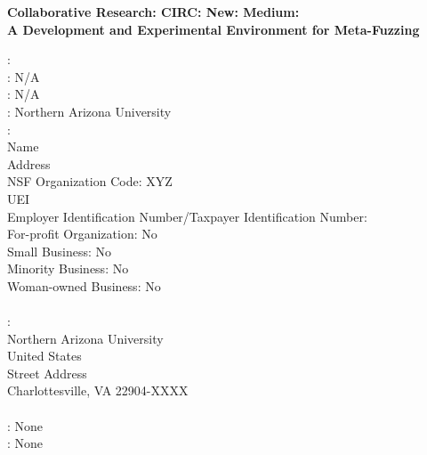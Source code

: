 

\begin{Center}
\Large
\bf
Collaborative Research: CIRC: New: Medium: \\A Development and Experimental Environment for Meta-Fuzzing
\end{Center}

\noindent {}: 
\\

\noindent {}: N/A
\\

\noindent {}: N/A
\\

\noindent {}: Northern Arizona University
\\

\noindent {}:    \\
\indent Name \\
\indent Address \\
\indent NSF Organization Code: XYZ \\
\indent UEI \\
\indent Employer Identification Number/Taxpayer Identification Number:  \\
\indent For-profit Organization: No\\
\indent Small Business: No\\
\indent Minority Business: No\\
\indent Woman-owned Business: No\\
\\

\noindent {}:    \\
\indent Northern Arizona University \\
\indent United States \\
\indent Street Address\\
\indent Charlottesville, VA 22904-XXXX\\
\\

\noindent {}: None
\\

\noindent {}: None
\\

